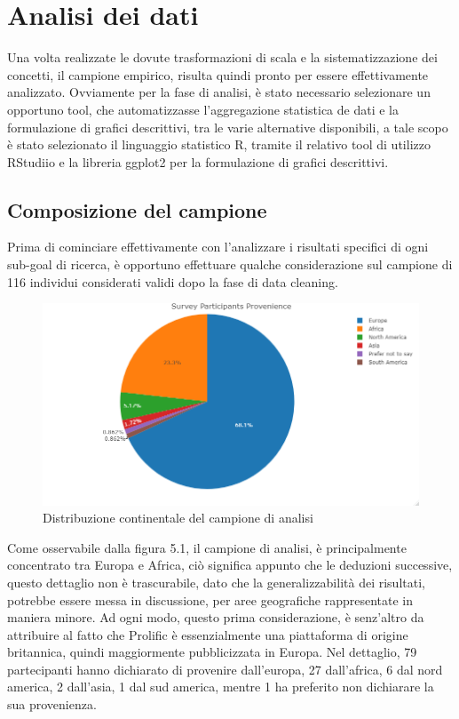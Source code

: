     \section{Analisi dei dati}
    Una volta realizzate le dovute trasformazioni di scala e la sistematizzazione dei concetti, il campione empirico, risulta quindi pronto per essere effettivamente analizzato. Ovviamente per la fase di analisi, è stato necessario selezionare un opportuno tool, che automatizzasse l'aggregazione statistica de dati e la formulazione di grafici descrittivi, tra le varie alternative disponibili, a tale scopo è stato selezionato il linguaggio statistico R, tramite il relativo tool di utilizzo RStudiio e la libreria ggplot2 per la formulazione di grafici descrittivi.
    
    \subsection{Composizione del campione}
    
    Prima di cominciare effettivamente con l'analizzare i risultati specifici di ogni sub-goal di ricerca, è opportuno effettuare qualche considerazione sul campione di 116 individui considerati validi dopo la fase di data cleaning. \\

    
    \begin{figure}[h]
        \centering
        \includegraphics[width=1\textwidth]{figure/Analisi/Background/Survey_Partecipants_Provenience.png}
        \caption{Distribuzione continentale del campione di analisi}
    \end{figure}
    
    Come osservabile dalla figura 5.1, il campione di analisi, è principalmente concentrato tra Europa e Africa, ciò significa appunto che le deduzioni successive, questo dettaglio non è trascurabile, dato che la generalizzabilità dei risultati, potrebbe essere messa in discussione, per aree geografiche rappresentate in maniera minore. Ad ogni modo, questo prima considerazione, è senz'altro da attribuire al fatto che Prolific è essenzialmente una piattaforma di origine britannica, quindi maggiormente pubblicizzata in Europa. Nel dettaglio, 79 partecipanti hanno dichiarato di provenire dall'europa, 27 dall'africa, 6 dal nord america, 2 dall'asia, 1 dal sud america, mentre 1 ha preferito non dichiarare la sua provenienza.
    
